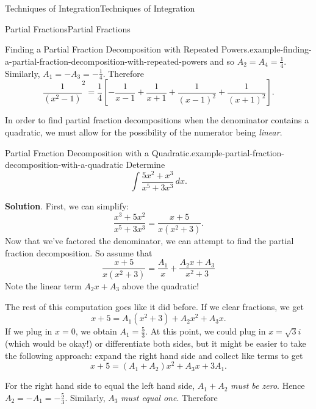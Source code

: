 \documentclass[10pt,]{book}
\numberwithin{equation}{section}
\begin{document}
\begin{chapterptx}{Techniques of Integration}{}{Techniques of Integration}{}{}
\begin{sectionptx}{Partial Fractions}{}{Partial Fractions}{}{}
\begin{example}{Finding a Partial Fraction Decomposition with Repeated Powers.}{example-finding-a-partial-fraction-decomposition-with-repeated-powers}
and so \(A_{2} = A_{4} = \frac{1}{4}\). Similarly, \(A_{1} = - A_{3} = -\frac{1}{4}\). Therefore%
\begin{equation*}
\frac{1}{(x^{2} - 1)}^{2} = \frac{1}{4}\left[-\frac{1}{x-1} + \frac{1}{x+1} + \frac{1}{(x-1)^{2}} + \frac{1}{(x+1)^{2}}\right].
\end{equation*}
%
\end{example}
\hypertarget{p-559}{}%
In order to find partial fraction decompositions when the denominator contains a quadratic, we must allow for the possibility of the numerator being \emph{linear}.%
\begin{example}{Partial Fraction Decomposition with a Quadratic.}{example-partial-fraction-decomposition-with-a-quadratic}%
\hypertarget{p-560}{}%
Determine%
\begin{equation*}
\int\frac{5x^{2} + x^{3}}{x^{5} + 3x^{3}}\,dx.
\end{equation*}
%
\par\smallskip%
\noindent\textbf{Solution}.\hypertarget{solution-123}{}\quad%
\hypertarget{p-561}{}%
First, we can simplify:%
\begin{equation*}
\frac{x^{3} + 5x^{2}}{x^{5} + 3x^{3}} = \frac{x + 5}{x(x^{2} + 3)}.
\end{equation*}
Now that we've factored the denominator, we can attempt to find the partial fraction decomposition. So assume that%
\begin{equation*}
\frac{x + 5}{x(x^{2} + 3)} = \frac{A_{1}}{x} + \frac{A_{2}x + A_{3}}{x^{2} + 3}
\end{equation*}
Note the linear term \(A_{2}x + A_{3}\) above the quadratic!%
\par
\hypertarget{p-562}{}%
The rest of this computation goes like it did before. If we clear fractions, we get%
\begin{equation*}
x + 5 = A_{1}(x^{2} + 3) + A_{2}x^{2} + A_{3}x.
\end{equation*}
If we plug in \(x = 0\), we obtain \(A_{1} = \frac{5}{3}\). At this point, we could plug in \(x = \sqrt{3}i\) (which would be okay!) or differentiate both sides, but it might be easier to take the following approach: expand the right hand side and collect like terms to get%
\begin{equation*}
x + 5 = (A_{1} + A_{2})x^{2} + A_{3}x + 3A_{1}.
\end{equation*}
%
\par
\hypertarget{p-563}{}%
For the right hand side to equal the left hand side, \(A_{1} + A_{2}\) \emph{must be zero}. Hence \(A_{2} = -A_{1} = -\frac{5}{3}\). Similarly, \(A_{3}\) \emph{must equal one}. Therefore%

\end{example}
\end{sectionptx}
\end{chapterptx}
\end{document}
